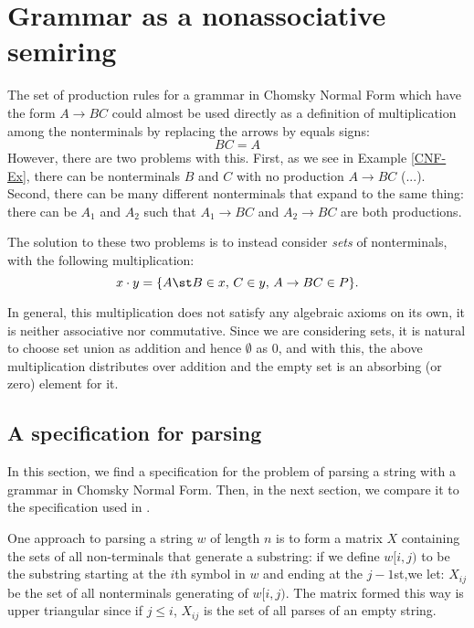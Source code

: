 \section{Grammar as a nonassociative semiring}
\label{Parsing-Algebra}
The set of production rules for a grammar in Chomsky Normal Form which have the form $A \to BC$ could almost be used directly as a definition of multiplication among the nonterminals by replacing the arrows by equals signs:
\begin{equation*}
  BC = A
\end{equation*}
However, there are two problems with this. First, as we see in Example \ref{CNF-Ex}, there can be nonterminals $B$ and $C$ with no production $A \to BC$ (...). Second, there can be many different nonterminals that expand to the same thing: there can be $A_1$ and $A_2$ such that $A_1 \to BC$ and $A_2 \to BC$ are both productions.

The solution to these two problems is to instead consider \emph{sets} of nonterminals, with the following multiplication:
\begin{equation*}
  x \cdot y = \{A \st B \in x,\, C \in y,\, A \to BC \in P\}.
\end{equation*}

In general, this multiplication does not satisfy any algebraic axioms on its own, it is neither associative nor commutative.
Since we are considering sets, it is natural to choose set union as addition and hence $\emptyset$ as $0$, and with this, the above multiplication distributes over addition and the empty set is an absorbing (or zero) element for it.
\subsection{A specification for parsing}
In this section, we find a specification for the problem of parsing a string with a grammar in Chomsky Normal Form. Then, in the next section, we compare it to the specification used in \cite{Valiant}.

One approach to parsing a string $w$ of length $n$ is to form a matrix $X$ containing the sets of all non-terminals that generate a substring: if we define $w[i,j)$ to be the substring starting at the $i$th symbol in $w$ and ending at the $j-1$st,we let: $X_{i j}$ be the set of all nonterminals generating of $w[i,j)$. The matrix formed this way is upper triangular since if $j \le i$, $X_{i j}$ is the set of all parses of an empty string.

